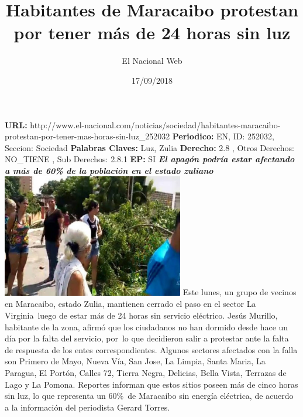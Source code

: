 \documentclass{article}%
\title{\textbf{Habitantes de Maracaibo protestan por tener más de 24 horas sin luz}}%
\author{El Nacional Web}%
\date{17/09/2018}%
\begin{document}
%
\normalsize%
\maketitle%
\textbf{URL: }%
http://www.el{-}nacional.com/noticias/sociedad/habitantes{-}maracaibo{-}protestan{-}por{-}tener{-}mas{-}horas{-}sin{-}luz\_252032\newline%
%
\textbf{Periodico: }%
EN, %
ID: %
252032, %
Seccion: %
Sociedad\newline%
%
\textbf{Palabras Claves: }%
Luz, Zulia\newline%
%
\textbf{Derecho: }%
2.8%
, Otros Derechos: %
NO\_TIENE%
, Sub Derechos: %
2.8.1%
\newline%
%
\textbf{EP: }%
SI\newline%
\newline%
%
\textbf{\textit{El apagón podría estar afectando a más de 60\% de la población en el estado zuliano~}}%
\newline%
\newline%
%
\includegraphics[width=300px]{214.jpg}%
\newline%
%
Este lunes, un grupo de vecinos en Maracaibo, estado Zulia, mantienen cerrado el paso en el sector La Virginia~luego de estar más de 24 horas sin servicio eléctrico.%
\newline%
%
Jesús Murillo, habitante de la zona, afirmó que los ciudadanos no han dormido desde hace un día por la falta del servicio, por~lo que decidieron salir a protestar ante la falta de respuesta de los entes correspondientes.%
\newline%
%
Algunos sectores afectados con la falla son Primero de Mayo, Nueva Vía, San Jose, La Limpia, Santa Maria, La Paragua, El Portón, Calles 72, Tierra Negra, Delicias, Bella Vista, Terrazas de Lago y La Pomona.%
\newline%
%
Reportes informan que estos sitios poseen más de cinco horas sin luz, lo que representa un 60\%~de Maracaibo sin energía eléctrica, de acuerdo a la información del periodista Gerard Torres.%
\newline%
%
\end{document}
